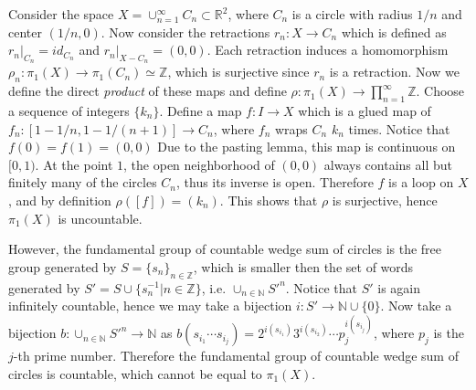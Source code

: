 \begin{exmp} Consider the space $X=\cup_{n=1}^{\infty} C_n\subset \mathbb{R}^2$, where $C_n$ is a circle with radius $1/n$ and center $(1/n,0)$. Now consider the retractions $r_n:X\rightarrow C_n$ which is defined as $r_n|_{C_n}=id_{C_n}$ and $r_n|_{X-C_n}=(0,0)$. Each retraction induces a homomorphism $\rho_n:\pi_1(X)\rightarrow \pi_1(C_n)\simeq \mathbb{Z}$, which is surjective since $r_n$ is a retraction. Now we define the direct \textit{product} of these maps and define $\rho:\pi_1(X)\rightarrow \prod_{n=1}^\infty \mathbb{Z}$. Choose a sequence of integers $\{k_n\}$. Define a map $f:I\rightarrow X$ which is a glued map of $f_n:[1-1/n,1-1/(n+1)]\rightarrow C_n$, where $f_n$ wraps $C_n$ $k_n$ times. Notice that $f(0)=f(1)=(0,0)$ Due to the pasting lemma, this map is continuous on $[0,1)$. At the point $1$, the open neighborhood of $(0,0)$ always contains all but finitely many of the circles $C_n$, thus its inverse is open. Therefore $f$ is a loop on $X$, and by definition $\rho([f])=(k_n)$. This shows that $\rho$ is surjective, hence $\pi_1(X)$ is uncountable.

However, the fundamental group of countable wedge sum of circles is the free group generated by $S=\{s_n\}_{n\in \mathbb{Z}}$, which is smaller then the set of words generated by $S'=S\cup \{s_n^{-1}|n\in \mathbb{Z}\}$, i.e. $\cup_{n\in \mathbb{N}}S'^n$. Notice that $S'$ is again infinitely countable, hence we may take a bijection $i:S'\rightarrow \mathbb{N}\cup \{0\}$. Now take a bijection $b:\cup_{n\in \mathbb{N}}S'^n\rightarrow \mathbb{N}$ as $b(s_{i_1}\cdots s_{i_j})=2^{i(s_{i_1})}3^{i(s_{i_2})}\cdots p_j^{i(s_{i_j})}$, where $p_j$ is the $j$-th prime number. Therefore the fundamental group of countable wedge sum of circles is countable, which cannot be equal to $\pi_1(X)$.
\end{exmp}


